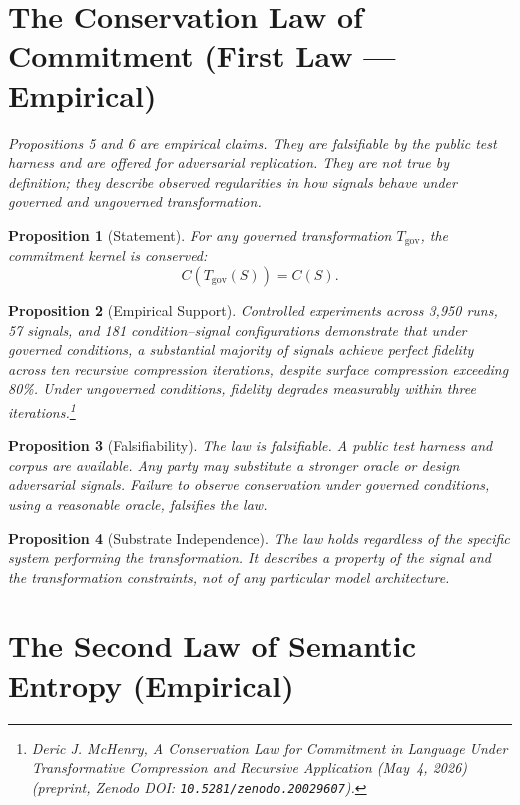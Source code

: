 \documentclass[11pt,a4paper]{article}
\newtheorem{proposition}{Proposition}[section]
\begin{document}
\section{The Conservation Law of Commitment (First Law --- Empirical)}

\textit{Propositions 5 and 6 are empirical claims. They are falsifiable by the public test harness and are offered for adversarial replication. They are not true by definition; they describe observed regularities in how signals behave under governed and ungoverned transformation.}

\begin{proposition}[Statement]
For any governed transformation $T_{\text{gov}}$, the commitment kernel is conserved:
\[
C(T_{\text{gov}}(S)) = C(S).
\]
\end{proposition}

\begin{proposition}[Empirical Support]
Controlled experiments across 3{,}950 runs, 57 signals, and 181 condition--signal configurations demonstrate that under governed conditions, a substantial majority of signals achieve perfect fidelity across ten recursive compression iterations, despite surface compression exceeding 80\%. Under ungoverned conditions, fidelity degrades measurably within three iterations.\footnote{Deric J. McHenry, \textit{A Conservation Law for Commitment in Language Under Transformative Compression and Recursive Application} (May~4, 2026) (preprint, Zenodo DOI: \texttt{10.5281/zenodo.20029607}).}
\end{proposition}

\begin{proposition}[Falsifiability]
The law is falsifiable. A public test harness and corpus are available. Any party may substitute a stronger oracle or design adversarial signals. Failure to observe conservation under governed conditions, using a reasonable oracle, falsifies the law.
\end{proposition}

\begin{proposition}[Substrate Independence]
The law holds regardless of the specific system performing the transformation. It describes a property of the signal and the transformation constraints, not of any particular model architecture.
\end{proposition}

\section{The Second Law of Semantic Entropy (Empirical)}
\end{document}

